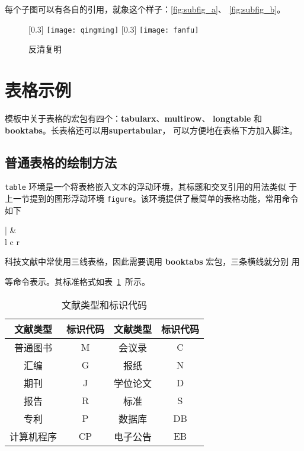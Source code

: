 每个子图可以有各自的引用，就象这个样子：\ref{fig:subfig_a}、
\ref{fig:subfig_b}。

\begin{figure}[htbp]
\centering
{}[0.3\textwidth]{
    \texttt{[image: qingming]}
}
\hspace{36pt}
[0.3\textwidth]{
    \texttt{[image: fanfu]}
}
\caption{反清复明}
\end{figure}

\section{表格示例}
\label{sec:table}

模板中关于表格的宏包有四个：\textbf{tabularx}、\textbf{multirow}、
\textbf{longtable} 和\textbf{booktabs}。长表格还可以用\textbf{supertabular}，
可以方便地在表格下方加入脚注。

\subsection{普通表格的绘制方法}

\texttt{table} 环境是一个将表格嵌入文本的浮动环境，其标题和交叉引用的用法类似
于上一节提到的图形浮动环境 \texttt{figure}。该环境提供了最简单的表格功能，常用命令如下
\begin{latex}
\hline %
|      %
&      %
\\     %
l c r  %
\end{latex}

科技文献中常使用三线表格，因此需要调用 \textbf{booktabs} 宏包，三条横线就分别
用
\begin{latex}
\toprule
\midrule
\bottomrule
\end{latex}
等命令表示。其标准格式如表~\ref{table1}~所示。

\begin{table}[htbp]
\caption{文献类型和标识代码}
\label{table1}
\centering
\begin{tabular}{cccc}
\toprule
文献类型 & 标识代码 & 文献类型 & 标识代码\\
\midrule
普通图书 & M &  会议录 & C\\
汇编 & G & 报纸 & N\\
期刊 & J & 学位论文 & D\\
报告 & R & 标准 & S\\
专利 & P & 数据库 & DB\\
计算机程序 & CP & 电子公告 & EB\\
\bottomrule
\end{tabular}
\end{table}

